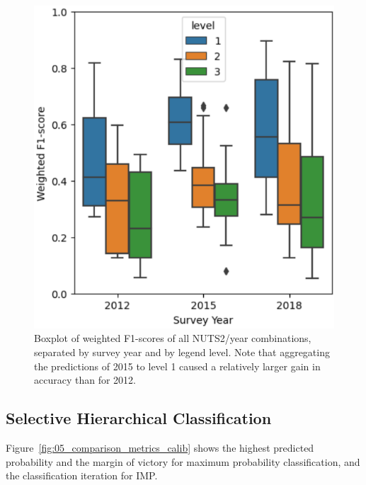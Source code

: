     \begin{figure}
        \centering
        \includegraphics[width=0.5\linewidth]{figs_05/boxplot_f1_year_lvl.png}
        \caption{Boxplot of weighted F1-scores of all NUTS2/year combinations, separated by survey year and by legend level. Note that aggregating the predictions of 2015 to level 1 caused a relatively larger gain in accuracy than for 2012.}
        \label{fig:boxplot_f1_year_lvl}
    \end{figure}

    \subsection{Selective Hierarchical Classification}

        Figure~\ref{fig:05_comparison_metrics_calib} shows the highest predicted probability and the margin of victory for maximum probability classification, and the classification iteration for IMP.
        
